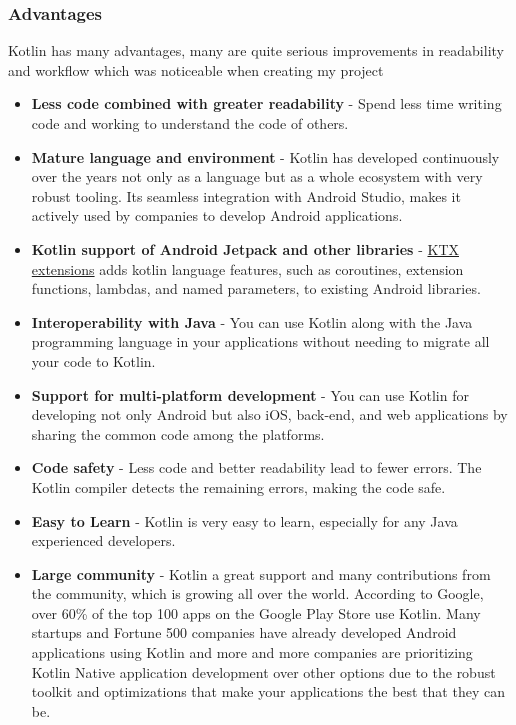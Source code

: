 \newpage

\subsubsection{Advantages}
Kotlin has many advantages, many are quite serious improvements in readability and workflow which was noticeable when creating my project

\begin{itemize}
    \item \textbf{Less code combined with greater readability} - Spend less time writing code and working to understand the code of others.
    \item \textbf{Mature language and environment} - Kotlin has developed continuously over the years not only as a language but as a whole ecosystem with very robust tooling. Its seamless integration with Android Studio, makes it actively used by companies to develop Android applications.
    \item \textbf{Kotlin support of Android Jetpack and other libraries} - \hyperlink{https://developer.android.com/kotlin/ktx}{KTX extensions} adds kotlin language features, such as coroutines, extension functions, lambdas, and named parameters, to existing Android libraries.
    \item \textbf{Interoperability with Java} - You can use Kotlin along with the Java programming language in your applications without needing to migrate all your code to Kotlin. 
    \item \textbf{Support for multi-platform development} - You can use Kotlin for developing not only Android but also iOS, back-end, and web applications by sharing the common code among the platforms.
    \item \textbf{Code safety} - Less code and better readability lead to fewer errors. The Kotlin compiler detects the remaining errors, making the code safe. 
    \item \textbf{Easy to Learn} - Kotlin is very easy to learn, especially for any Java experienced developers. 
    \item \textbf{Large community} - Kotlin a great support and many contributions from the community, which is growing all over the world. According to Google, over 60\% of the top 100 apps on the Google Play Store use Kotlin. Many startups and Fortune 500 companies have already developed Android applications using Kotlin and more and more companies are prioritizing Kotlin Native application development over other options due to the robust toolkit and optimizations that make your applications the best that they can be. 
\end{itemize}

